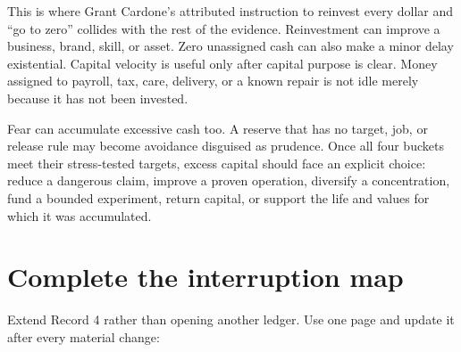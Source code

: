 This is where Grant Cardone's attributed instruction to reinvest every dollar
and “go to zero” collides with the rest of the evidence. Reinvestment can
improve a business, brand, skill, or asset. Zero unassigned cash can also make a
minor delay existential. Capital velocity is useful only after capital purpose
is clear. Money assigned to payroll, tax, care, delivery, or a known repair is
not idle merely because it has not been invested.

Fear can accumulate excessive cash too. A reserve that has no target, job, or
release rule may become avoidance disguised as prudence. Once all four buckets
meet their stress-tested targets, excess capital should face an explicit
choice: reduce a dangerous claim, improve a proven operation, diversify a
concentration, fund a bounded experiment, return capital, or support the life
and values for which it was accumulated.

\section{Complete the interruption map}

Extend Record 4 rather than opening another ledger. Use one page and update it
after every material change:

